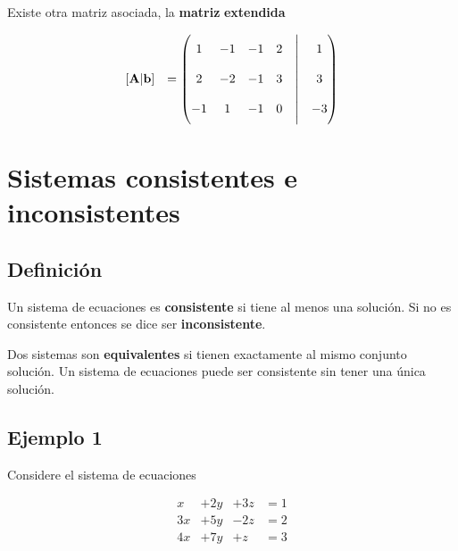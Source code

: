 \documentclass[
]{article}
\begin{document}
Existe otra matriz asociada, la \textbf{matriz} \textbf{extendida}

\begin{equation*}
 \begin{array}{cc}
  [\mathbf{A}| \mathbf{b}] & = \begin{pmatrix}
                                  1   & - 1 & - 1  & 2 &\biggm| & 1  \\
                                  2   & - 2 & - 1  & 3 &\biggm| & 3   \\
                                 -1   &   1 &  -1  & 0 &\biggm| &-3
                                \end{pmatrix}
 \end{array}
\end{equation*}

\hypertarget{sistemas-consistentes-e-inconsistentes}{%
\section{Sistemas consistentes e
inconsistentes}\label{sistemas-consistentes-e-inconsistentes}}

\hypertarget{definiciuxf3n}{%
\subsection{Definición}\label{definiciuxf3n}}

Un sistema de ecuaciones es \textbf{consistente} si tiene al menos una
solución. Si no es consistente entonces se dice ser
\textbf{inconsistente}.

Dos sistemas son \textbf{equivalentes} si tienen exactamente al mismo
conjunto solución. Un sistema de ecuaciones puede ser consistente sin
tener una única solución.

\hypertarget{ejemplo-1}{%
\subsection{Ejemplo 1}\label{ejemplo-1}}

Considere el sistema de ecuaciones

\begin{equation*}
  \begin{matrix}
           x  & +2 y  & +3z & = 1  \\
           3x & +5 y  & -2z & = 2   \\
           4x & +7 y  & +z  & = 3
  \end{matrix}
\end{equation*}
\end{document}
